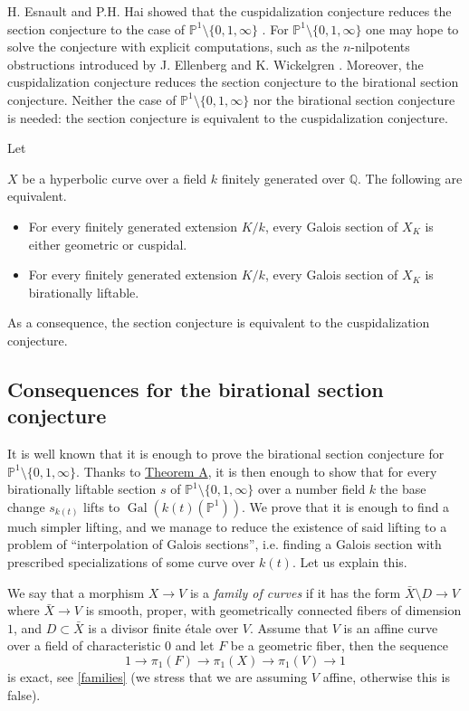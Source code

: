 \documentclass[11pt]{amsart}
\theoremstyle{plain}
\theoremstyle{definition}
\newcommand{\on}{\operatorname}
\newcommand{\1}{\mathbb{1}}
\newcommand{\gal}{\on{Gal}}
\newcommand{\Q}{\mathbb{Q}}
\renewcommand{\P}{\mathbb{P}}
\begin{document}
H. Esnault and P.H. Hai showed that the cuspidalization conjecture reduces the section conjecture to the case of $\P^{1}\setminus\{0,1,\infty\}$ \cite[Proposition 7.9]{eh08}. For $\P^{1}\setminus\{0,1,\infty\}$ one may hope to solve the conjecture with explicit computations, such as the $n$-nilpotents obstructions introduced by J. Ellenberg and K. Wickelgren \cite{wic12}. Moreover, the cuspidalization conjecture reduces the section conjecture to the birational section conjecture. Neither the case of $\P^{1}\setminus\{0,1,\infty\}$ nor the birational section conjecture is needed: the section conjecture is equivalent to the cuspidalization conjecture.


\begin{TB}
	\hypertarget{TB}{Let} $X$ be a hyperbolic curve over a field $k$ finitely generated over $\Q$. The following are equivalent.
	\begin{itemize}
		\item For every finitely generated extension $K/k$, every Galois section of $X_{K}$ is either geometric or cuspidal.
		\item For every finitely generated extension $K/k$, every Galois section of $X_{K}$ is birationally liftable.
	\end{itemize}
        As a consequence, the section conjecture is equivalent to the cuspidalization conjecture.
\end{TB}



\subsection{Consequences for the birational section conjecture}

It is well known that it is enough to prove the birational section conjecture for $\P^{1}\setminus\{0,1,\infty\}$. Thanks to \hyperlink{TA}{Theorem A}, it is then enough to show that for every birationally liftable section $s$ of $\P^{1}\setminus\{0,1,\infty\}$ over a number field $k$ the base change $s_{k(t)}$ lifts to $\gal(k(t)(\P^{1}))$. We prove that it is enough to find a much simpler lifting, and we manage to reduce the existence of said lifting to a problem of ``interpolation of Galois sections'', i.e. finding a Galois section with prescribed specializations of some curve over $k(t)$. Let us explain this.

We say that a morphism $X\to V$ is a \emph{family of curves} if it has the form $\bar{X}\setminus D\to V$ where $\bar{X}\to V$ is smooth, proper, with geometrically connected fibers of dimension $1$, and $D\subset\bar{X}$ is a divisor finite étale over $V$. Assume that $V$ is an affine curve over a field of characteristic $0$ and let $F$ be a geometric fiber, then the sequence
\[1 \to \pi_{1}(F)\to\pi_{1}(X)\to\pi_{1}(V)\to 1\]
is exact, see \autoref{families} (we stress that we are assuming $V$ affine, otherwise this is false).
\end{document}
